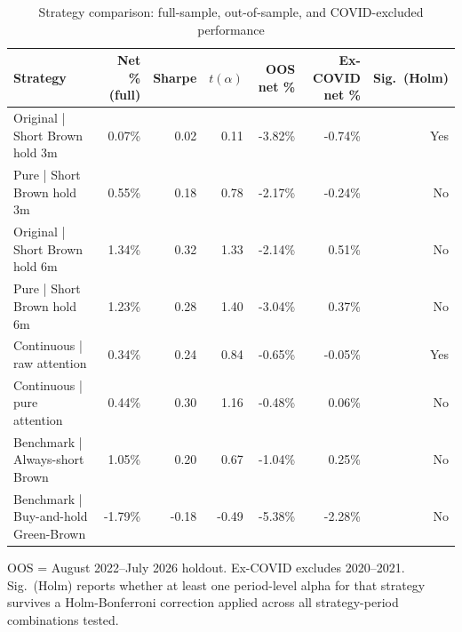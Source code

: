 \begin{table}[!ht]
\centering
\caption{Strategy comparison: full-sample, out-of-sample, and COVID-excluded performance}
\label{tab:comparison}
\scriptsize
\begin{tabular}{lrrrrrr}
\toprule
Strategy & Net \% (full) & Sharpe & $t(\alpha)$ & OOS net \% & Ex-COVID net \% & Sig.\ (Holm) \\
\midrule
Original | Short Brown hold 3m & 0.07\% & 0.02 & 0.11 & -3.82\% & -0.74\% & Yes \\
Pure | Short Brown hold 3m & 0.55\% & 0.18 & 0.78 & -2.17\% & -0.24\% & No \\
Original | Short Brown hold 6m & 1.34\% & 0.32 & 1.33 & -2.14\% & 0.51\% & No \\
Pure | Short Brown hold 6m & 1.23\% & 0.28 & 1.40 & -3.04\% & 0.37\% & No \\
Continuous | raw attention & 0.34\% & 0.24 & 0.84 & -0.65\% & -0.05\% & Yes \\
Continuous | pure attention & 0.44\% & 0.30 & 1.16 & -0.48\% & 0.06\% & No \\
Benchmark | Always-short Brown & 1.05\% & 0.20 & 0.67 & -1.04\% & 0.25\% & No \\
Benchmark | Buy-and-hold Green-Brown & -1.79\% & -0.18 & -0.49 & -5.38\% & -2.28\% & No \\
\bottomrule
\end{tabular}
\begin{minipage}{0.95\textwidth}\footnotesize
OOS = August 2022--July 2026 holdout. Ex-COVID excludes 2020--2021. Sig.\ (Holm) reports whether at least one period-level alpha for that strategy survives a Holm-Bonferroni correction applied across all strategy-period combinations tested.
\end{minipage}
\end{table}